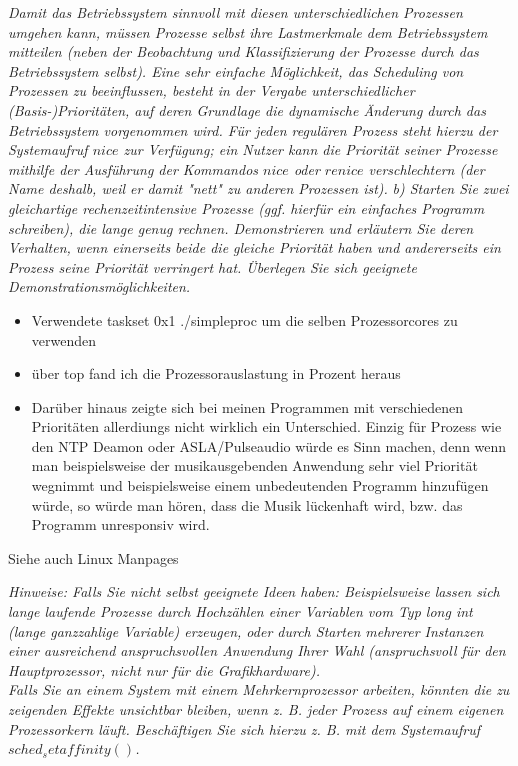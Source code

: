 \documentclass[a4paper]{article}
\begin{document}
\textit{Damit das Betriebssystem sinnvoll mit diesen unterschiedlichen Prozessen umgehen kann, müssen Prozesse selbst ihre Lastmerkmale dem Betriebssystem mitteilen (neben der Beobachtung und Klassifizierung der Prozesse durch das Betriebssystem selbst). Eine sehr einfache Möglichkeit, das Scheduling von Prozessen zu beeinflussen, besteht in der Vergabe unterschiedlicher (Basis-)Prioritäten, auf deren Grundlage die dynamische Änderung durch das Betriebssystem vorgenommen wird. Für jeden regulären Prozess steht hierzu der Systemaufruf $nice$ zur Verfügung; ein Nutzer kann die Priorität seiner Prozesse mithilfe der Ausführung
    der Kommandos $nice$ oder $renice$ verschlechtern (der Name deshalb, weil er damit "nett" zu anderen Prozessen ist).}
\vspace{10mm}
\textit{b) Starten Sie zwei gleichartige rechenzeitintensive Prozesse (ggf. hierfür ein einfaches Programm schreiben), die lange genug rechnen. Demonstrieren und erläutern Sie deren Verhalten, wenn einerseits beide die gleiche Priorität haben und andererseits ein Prozess seine Priorität verringert hat. Überlegen Sie sich geeignete Demonstrationsmöglichkeiten.}
\vspace{10mm}

\begin{itemize}
	\item Verwendete taskset 0x1 ./simpleproc um die selben Prozessorcores zu verwenden
	\item über top fand ich die Prozessorauslastung in Prozent heraus
	\item Darüber hinaus zeigte sich bei meinen Programmen mit verschiedenen Prioritäten allerdiungs nicht wirklich ein Unterschied. Einzig für Prozess wie den NTP Deamon oder ASLA/Pulseaudio würde es Sinn machen, denn wenn man beispielsweise der musikausgebenden Anwendung sehr viel Priorität wegnimmt und beispielsweise einem unbedeutenden Programm hinzufügen würde, so würde man hören, dass die Musik lückenhaft wird, bzw. das Programm unresponsiv wird. 
\end{itemize}
Siehe auch Linux Manpages

\textit{
    Hinweise:
    Falls Sie nicht selbst geeignete Ideen haben: Beispielsweise lassen sich lange laufende Prozesse durch Hochzählen einer Variablen vom Typ long int (lange ganzzahlige Variable) erzeugen, oder durch Starten mehrerer Instanzen einer ausreichend anspruchsvollen Anwendung Ihrer Wahl (anspruchsvoll für den Hauptprozessor, nicht nur für die Grafikhardware).\\
    Falls Sie an einem System mit einem Mehrkernprozessor arbeiten, könnten die zu zeigenden Effekte unsichtbar bleiben, wenn z. B. jeder Prozess auf einem eigenen Prozessorkern läuft. Beschäftigen Sie sich hierzu z. B. mit dem Systemaufruf $sched_setaffinity()$.
}
\vspace{10mm}
\end{document}
